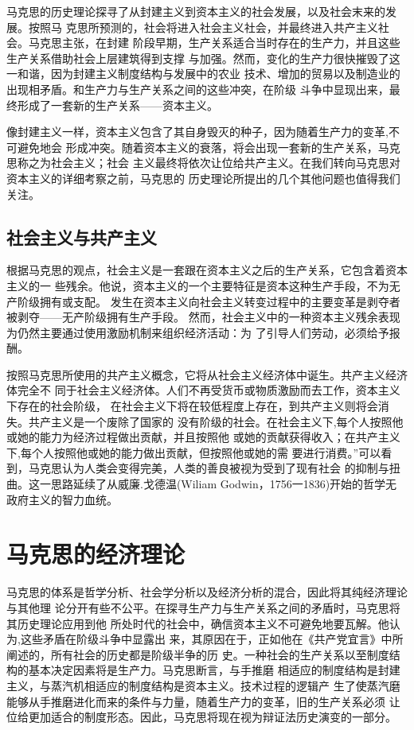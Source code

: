马克思的历史理论探寻了从封建主义到资本主义的社会发展，以及社会末来的发展。按照马
克思所预测的，社会将进入社会主义社会，并最终进入共产主义社会。马克思主张，在封建
阶段早期，生产关系适合当时存在的生产力，并且这些生产关系借助社会上层建筑得到支撑
与加强。然而，变化的生产力很快摧毁了这一和谐，因为封建主义制度结构与发展中的农业
技术、增加的贸易以及制造业的出现相矛盾。和生产力与生产关系之间的这些冲突，在阶级
斗争中显现出来，最终形成了一套新的生产关系——资本主义。

像封建主义一样，资本主义包含了其自身毁灭的种子，因为随着生产力的变革,不可避免地会
形成冲突。随着资本主义的衰落，将会出现一套新的生产关系，马克思称之为社会主义；社会
主义最终将依次让位给共产主义。在我们转向马克思对资本主义的详细考察之前，马克思的
历史理论所提出的几个其他问题也值得我们关注。

\subsection{社会主义与共产主义}

根据马克思的观点，社会主义是一套跟在资本主义之后的生产关系，它包含着资本主义的一
些残余。他说，资本主义的一个主要特征是资本这种生产手段，不为无产阶级拥有或支配。
发生在资本主义向社会主义转变过程中的主要变革是剥夺者被剥夺——无产阶级拥有生产手段。
然而，社会主义中的一种资本主义残余表现为仍然主要通过使用激励机制来组织经济活动：为
了引导人们劳动，必须给予报酬。

按照马克思所使用的共产主义概念，它将从社会主义经济体中诞生。共产主义经济体完全不
同于社会主义经济体。人们不再受货币或物质激励而去工作，资本主义下存在的社会阶级，
在社会主义下将在较低程度上存在，到共产主义则将会消失。共产主义是一个废除了国家的
没有阶级的社会。在社会主义下,每个人按照他或她的能力为经济过程做出贡献，并且按照他
或她的贡献获得收入；在共产主义下,每个人按照他或她的能力做出贡献，但按照他或她的需
要进行消费。”可以看到，马克思认为人类会变得完美，人类的善良被视为受到了现有社会
的抑制与扭曲。这一思路延续了从威廉.戈德温(Wiliam Godwin，1756一1836)开始的哲学无
政府主义的智力血统。

\section{马克思的经济理论}

马克思的体系是哲学分析、社会学分析以及经济分析的混合，因此将其纯经济理论与其他理
论分开有些不公平。在探寻生产力与生产关系之间的矛盾时，马克思将其历史理论应用到他
所处时代的社会中，确信资本主义不可避免地要瓦解。他认为,这些矛盾在阶级斗争中显露出
来，其原因在于，正如他在《共产党宜言》中所阐述的，所有社会的历史都是阶级半争的历
史。一种社会的生产关系以至制度结构的基本决定因素将是生产力。马克思断言，与手推磨
相适应的制度结构是封建主义，与蒸汽机相适应的制度结构是资本主义。技术过程的逻辑产
生了使蒸汽磨能够从手推磨进化而来的条件与力量，随着生产力的变革，旧的生产关系必须
让位给更加适合的制度形态。因此，马克思将现在视为辩证法历史演变的一部分。

